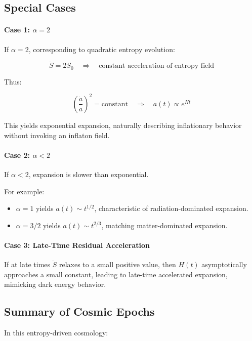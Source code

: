 \documentclass{article}
\begin{document}
\subsection{Special Cases}

\paragraph{Case 1: $\alpha = 2$}

If $\alpha = 2$, corresponding to quadratic entropy evolution:

\[
\ddot{S} = 2S_0
\quad \Rightarrow \quad \text{constant acceleration of entropy field}
\]

Thus:

\[
\left( \frac{\dot{a}}{a} \right)^2 = \text{constant}
\quad \Rightarrow \quad a(t) \propto e^{Ht}
\]

This yields exponential expansion, naturally describing inflationary behavior without invoking an inflaton field.

\paragraph{Case 2: $\alpha < 2$}

If $\alpha < 2$, expansion is slower than exponential.

For example:
\begin{itemize}
\item $\alpha = 1$ yields $a(t) \sim t^{1/2}$, characteristic of radiation-dominated expansion.
\item $\alpha = 3/2$ yields $a(t) \sim t^{2/3}$, matching matter-dominated expansion.
\end{itemize}

\paragraph{Case 3: Late-Time Residual Acceleration}

If at late times $\ddot{S}$ relaxes to a small positive value, then $H(t)$ asymptotically approaches a small constant, leading to late-time accelerated expansion, mimicking dark energy behavior.

\subsection{Summary of Cosmic Epochs}

In this entropy-driven cosmology:
\end{document}
